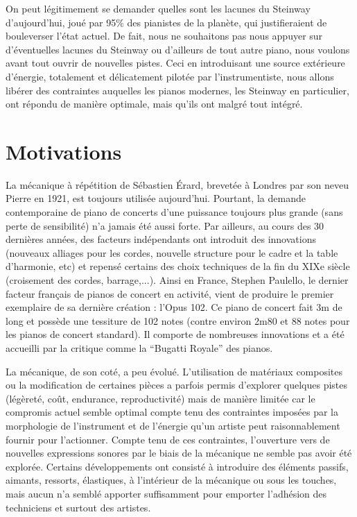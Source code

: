 \documentclass[french,a4paper,12pt]{report}
\begin{document}
\newpage
On peut légitimement se demander quelles sont les lacunes du Steinway d’aujourd’hui, joué par 95\% des pianistes de la planète, qui justifieraient de bouleverser l’état actuel.
De fait, nous ne souhaitons pas nous appuyer sur d’éventuelles lacunes du Steinway ou d’ailleurs de tout autre piano, nous voulons avant tout ouvrir de nouvelles pistes. 
 Ceci en introduisant une source extérieure d’énergie, totalement et délicatement pilotée par l’instrumentiste, nous allons libérer des contraintes auquelles les pianos modernes, les Steinway en particulier, ont répondu de manière optimale, mais qu’ils ont malgré tout intégré.
 
 \section{Motivations}
 
 La mécanique à répétition de Sébastien Érard, brevetée à Londres par son neveu Pierre en 1921, est toujours utilisée aujourd’hui. Pourtant, la demande contemporaine de piano de concerts d’une puissance toujours plus grande (sans perte de sensibilité) n’a jamais été aussi forte. Par ailleurs, au cours des 30 dernières années, des facteurs indépendants ont introduit des innovations (nouveaux alliages pour les cordes, nouvelle structure pour le cadre et la table d’harmonie, etc) et repensé certains des choix techniques de la fin du XIXe siècle (croisement des cordes, barrage,...). Ainsi en France, Stephen Paulello, le dernier facteur français de pianos de concert en activité, vient de produire le premier exemplaire de sa dernière création : l’Opus 102. Ce piano de concert fait 3m de long et possède une tessiture de 102 notes (contre environ 2m80 et 88 notes pour les pianos de concert standard). Il comporte de nombreuses innovations et a été accueilli par la critique comme la “Bugatti Royale” des pianos.

La mécanique, de son coté, a peu évolué. L’utilisation de matériaux composites ou la modification de certaines pièces a parfois permis d’explorer quelques pistes (légèreté, coût, endurance, reproductivité) mais de manière limitée car le compromis actuel semble optimal compte tenu des contraintes imposées par la morphologie de l’instrument et de l’énergie qu’un artiste peut raisonnablement fournir pour l’actionner. Compte tenu de ces contraintes, l’ouverture vers de nouvelles expressions sonores par le biais de la mécanique ne semble pas
avoir été explorée. Certains développements ont consisté à introduire des éléments passifs, aimants, ressorts, élastiques, à l’intérieur de la mécanique ou sous les touches, mais aucun n’a semblé apporter suffisamment pour emporter l’adhésion des techniciens et surtout des artistes.\newline
\end{document}
